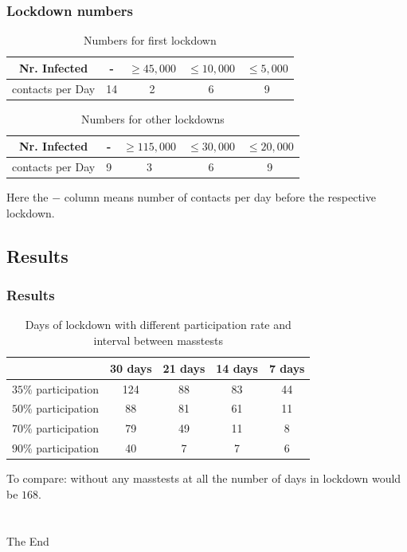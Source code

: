 \documentclass{beamer}
\begin{document}
\begin{frame}
  \frametitle{Lockdown numbers}

  \begin{table}[!h]
  \begin{center}
  \begin{tabular}{|c||c|c|c|c|}
  \hline
    Nr. Infected &- & $\geq 45,000$ & $\leq 10,000$ & $\leq 5,000$ \\
    \hline
    contacts per Day & 14 & 2 & 6 & 9 \\
    \hline
  \end{tabular}
  \end{center}
  \caption{Numbers for first lockdown}
  \end{table}

  \begin{table}[!h]
  \begin{center}
  \begin{tabular}{|c||c|c|c|c|}
  \hline
    Nr. Infected &- & $\geq 115,000$ & $\leq 30,000$ & $\leq 20,000$ \\
    \hline
    contacts per Day & 9 & 3 & 6 & 9 \\
    \hline
  \end{tabular}
  \end{center}
  \caption{Numbers for other lockdowns}
  \end{table}

  Here the $-$ column means number of contacts per day before the respective lockdown.
\end{frame}

\subsection{Results}

\begin{frame}
\frametitle{Results}

\begin{table}[!h]
{\small%
\begin{center}
\begin{tabular}{|c||c|c|c|c|}
 \hline
 & 30 days    & 21 days   & 14 days  & 7 days  \\
  \hline
  \hline
      $35\%$ participation    & 124 &  88&  83  & 44   \\
  \hline
      $50\%$ participation & 88 & 81 & 61 & 11 \\
  \hline
      $70\%$ participation & 79 &  49 & 11 & 8 \\
  \hline
      $90\%$ participation & 40 &7 &7  & 6\\
      \hline
\end{tabular}
\end{center}
}%

\caption{Days of lockdown with different participation rate and interval between masstests}
\end{table}
To compare: without any masstests at all the number of days in lockdown would be $168$.
\end{frame}
\section{}
\begin{frame}
\Huge{\centerline{The End}}
\end{frame}

\end{document}
